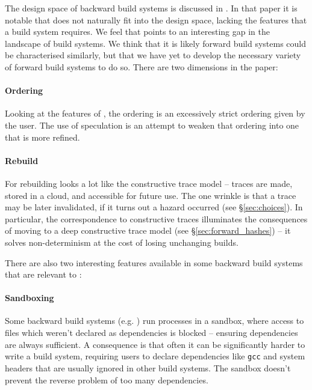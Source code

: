 The design space of backward build systems is discussed in \cite{build_systems_a_la_carte}. In that paper it is notable that \Fabricate does not naturally fit into the design space, lacking the features that a build system requires. We feel that points to an interesting gap in the landscape of build systems. We think that it is likely forward build systems could be characterised similarly, but that we have yet to develop the necessary variety of forward build systems to do so. There are two dimensions in the paper:

\paragraph{Ordering} Looking at the features of \Rattle, the ordering is an excessively strict ordering given by the user. The use of speculation is an attempt to weaken that ordering into one that is more refined.

\paragraph{Rebuild} For rebuilding \Rattle looks a lot like the constructive trace model -- traces are made, stored in a cloud, and accessible for future use. The one wrinkle is that a trace may be later invalidated, if it turns out a hazard occurred (see \S\ref{sec:choices}). In particular, the correspondence to constructive traces illuminates the consequences of moving to a deep constructive trace model (see \S\ref{sec:forward_hashes}) -- it solves non-determinism at the cost of losing unchanging builds.

\postparagraphs

There are also two interesting features available in some backward build systems that are relevant to \Rattle:

\paragraph{Sandboxing} Some backward build systems (e.g. \Bazel \cite{bazel}) run processes in a sandbox, where access to files which weren't declared as dependencies is blocked -- ensuring dependencies are always sufficient. A consequence is that often it can be significantly harder to write a \Bazel build system, requiring users to declare dependencies like \texttt{gcc} and system headers that are usually ignored in other build systems. The sandbox doesn't prevent the reverse problem of too many dependencies.

